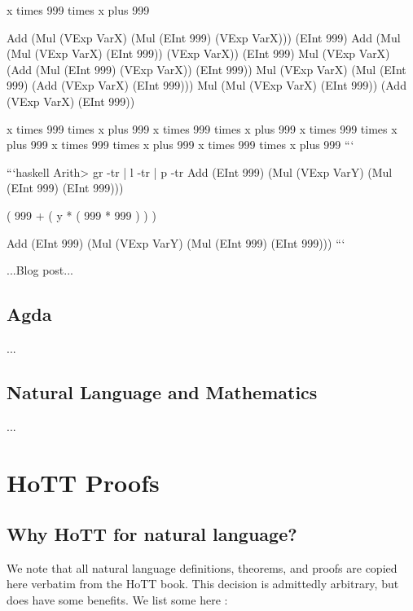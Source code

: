 \documentclass[11pt, a4paper]{article}
\begin{document}
x times 999 times x plus 999

Add (Mul (VExp VarX) (Mul (EInt 999) (VExp VarX))) (EInt 999) Add (Mul (Mul
(VExp VarX) (EInt 999)) (VExp VarX)) (EInt 999) Mul (VExp VarX) (Add (Mul (EInt
999) (VExp VarX)) (EInt 999)) Mul (VExp VarX) (Mul (EInt 999) (Add (VExp VarX)
(EInt 999))) Mul (Mul (VExp VarX) (EInt 999)) (Add (VExp VarX) (EInt 999))

x times 999 times x plus 999 x times 999 times x plus 999 x times 999 times x
plus 999 x times 999 times x plus 999 x times 999 times x plus 999 ```

```haskell Arith> gr -tr | l -tr | p -tr Add (EInt 999) (Mul (VExp VarY) (Mul
(EInt 999) (EInt 999)))

( 999 + ( y * ( 999 * 999 ) ) )

Add (EInt 999) (Mul (VExp VarY) (Mul (EInt 999) (EInt 999))) ```



...Blog post...



\subsection{Agda}

...

\subsection{Natural Language and Mathematics}

...

\section{HoTT Proofs}

\subsection{Why HoTT for natural language?}

We note that all natural language definitions, theorems, and proofs are copied
here verbatim from the HoTT book.  This decision is admittedly arbitrary, but
does have some benefits.  We list some here : 
\end{document}
